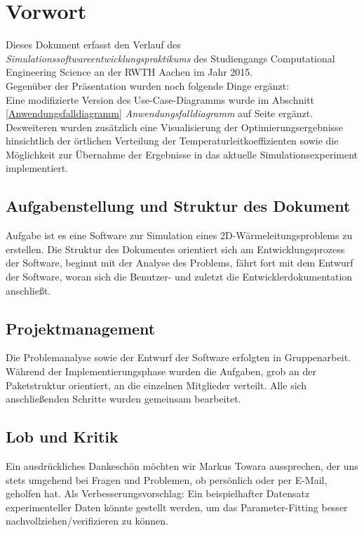 \chapter{Vorwort}

Dieses Dokument erfasst den Verlauf des \emph{Simulationssoftwareentwicklungspraktikums} des Studiengangs Computational Engineering Science an der RWTH Aachen im Jahr 2015. \\

\noindent
Gegenüber der Präsentation wurden noch folgende Dinge ergänzt:\\
Eine modifizierte Version des Use-Case-Diagramms wurde im Abschnitt \ref{Anwendungsfalldiagramm} \emph{Anwendungsfalldiagramm} auf Seite \pageref{Use Case Diagramm2} ergänzt. Desweiteren wurden zusätzlich eine Visualisierung der Optimierungsergebnisse hinsichtlich der örtlichen Verteilung der Temperaturleitkoeffizienten sowie die Möglichkeit zur Übernahme der Ergebnisse in das aktuelle Simulationsexperiment implementiert.


\section{Aufgabenstellung und Struktur des Dokument}

Aufgabe ist es eine Software zur Simulation eines 2D-Wärmeleitungsproblems zu erstellen. Die Struktur des Dokumentes orientiert sich am Entwicklungsprozess der Software, beginnt mit der Analyse des Problems, fährt fort mit dem Entwurf der Software, woran sich die Benutzer- und zuletzt die Entwicklerdokumentation anschließt.

\section{Projektmanagement}

Die Problemanalyse sowie der Entwurf der Software erfolgten in Gruppenarbeit. Während der Implementierungsphase wurden die Aufgaben, grob an der Paketstruktur orientiert, an die einzelnen Mitglieder verteilt. Alle sich anschließenden Schritte wurden gemeinsam bearbeitet.

\section{Lob und Kritik}

Ein ausdrückliches Dankeschön möchten wir Markus Towara aussprechen, der uns stets umgehend bei Fragen und Problemen, ob persönlich oder per E-Mail, geholfen hat.
Als Verbesserungsvorschlag: Ein beispielhafter Datensatz experimenteller Daten könnte gestellt werden, um das Parameter-Fitting besser nachvollziehen/verifizieren zu können.
